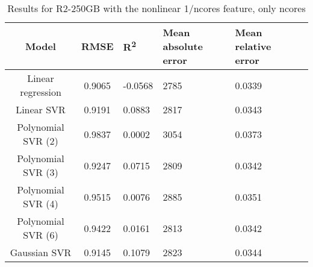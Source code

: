 \begin{table}[H]
\centering
\begin{adjustbox}{center}
\begin{tabular}{c | c M{1.2cm} M{2.5cm} M{2.5cm} M{1.8cm}}
Model & RMSE & R\textsuperscript{2} & Mean absolute error & Mean relative error \tabularnewline
\hline
Linear regression & 0.9065 & -0.0568 &   2785 & 0.0339 \\
Linear SVR & 0.9191 & 0.0883 &   2817 & 0.0343 \\
Polynomial SVR (2) & 0.9837 & 0.0002 &   3054 & 0.0373 \\
Polynomial SVR (3) & 0.9247 & 0.0715 &   2809 & 0.0342 \\
Polynomial SVR (4) & 0.9515 & 0.0076 &   2885 & 0.0351 \\
Polynomial SVR (6) & 0.9422 & 0.0161 &   2813 & 0.0342 \\
Gaussian SVR & 0.9145 & 0.1079 &   2823 & 0.0344 \\
\end{tabular}
\end{adjustbox}
\\
\caption{Results for R2-250GB with the nonlinear 1/ncores feature, only ncores}
\label{tab:all_nonlinear_R2_250}
\end{table}
